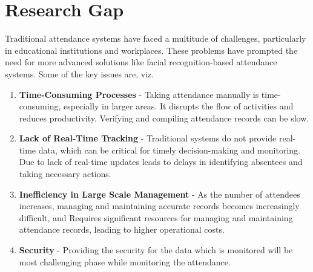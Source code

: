 \documentclass[12pt,a4paper]{report}
\begin{document}
\section{Research Gap}
\par Traditional attendance systems have faced a multitude of challenges, particularly in educational institutions and workplaces. These problems have prompted the need for more advanced solutions like facial recognition-based attendance systems. Some of the key issues are, viz.
\begin{enumerate}
	\item \textbf{Time-Consuming Processes} - Taking attendance manually is time-consuming, especially in larger areas. It disrupts the flow of activities and reduces productivity. Verifying and compiling attendance records can be slow.
	\item  \textbf{Lack of Real-Time Tracking} - Traditional systems do not provide real-time data, which can be critical for timely decision-making and monitoring. Due to lack of real-time updates leads to delays in identifying absentees and taking necessary actions.
	\item \textbf{Inefficiency in Large Scale Management} - As the number of attendees increases, managing and maintaining accurate records becomes increasingly difficult, and Requires significant resources for managing and maintaining attendance records, leading to higher operational costs.
	\item \textbf{Security} - Providing the security for the data which is monitored will be most challenging phase while monitoring the attendance.
\end{enumerate}
\end{document}
